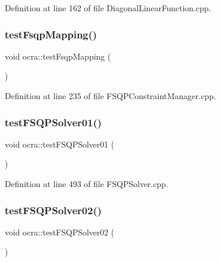 Definition at line 162 of file Diagonal\+Linear\+Function.\+cpp.

\hypertarget{namespaceocra_a8bf333a92a412aecd42bebe1b9befb93}{}\label{namespaceocra_a8bf333a92a412aecd42bebe1b9befb93} 
\subsubsection{\texorpdfstring{test\+Fsqp\+Mapping()}{testFsqpMapping()}}
{\footnotesize\ttfamily void ocra\+::test\+Fsqp\+Mapping (\begin{DoxyParamCaption}{ }\end{DoxyParamCaption})}



Definition at line 235 of file F\+S\+Q\+P\+Constraint\+Manager.\+cpp.

\hypertarget{namespaceocra_a6841398f134f5638989988f887e7d529}{}\label{namespaceocra_a6841398f134f5638989988f887e7d529} 
\subsubsection{\texorpdfstring{test\+F\+S\+Q\+P\+Solver01()}{testFSQPSolver01()}}
{\footnotesize\ttfamily void ocra\+::test\+F\+S\+Q\+P\+Solver01 (\begin{DoxyParamCaption}{ }\end{DoxyParamCaption})}



Definition at line 493 of file F\+S\+Q\+P\+Solver.\+cpp.

\hypertarget{namespaceocra_a59323105067ef321d36ac86c6b4aaff8}{}\label{namespaceocra_a59323105067ef321d36ac86c6b4aaff8} 
\subsubsection{\texorpdfstring{test\+F\+S\+Q\+P\+Solver02()}{testFSQPSolver02()}}
{\footnotesize\ttfamily void ocra\+::test\+F\+S\+Q\+P\+Solver02 (\begin{DoxyParamCaption}{ }\end{DoxyParamCaption})}



